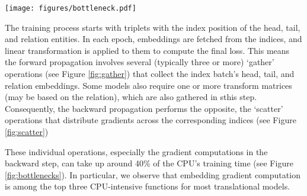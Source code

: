 \begin{figure*}[!t]
\centering
\texttt{[image: figures/bottleneck.pdf]}
\caption{Top three CPU intensive functions for various translation-based KGE models and datasets (indicated in bracket). The redness represents the popularity of a function among models. The dark red box indicates that the corresponding function is used in several different models.  indicates that the function is typically exclusive to the current model. The dark gray box indicates the dataset loading time. The light gray box indicates the rest of the training time.}
\label{fig:bottlenecks}
\end{figure*}

The training process starts with triplets with the index position of the head, tail, and relation entities. In each epoch, embeddings are fetched from the indices, and linear transformation is applied to them to compute the final loss. This means the forward propagation involves several (typically three or more) `gather' operations (see Figure \ref{fig:gather}) that collect the index batch's head, tail, and relation embeddings. Some models also require one or more transform matrices (may be based on the relation), which are also gathered in sthis step. Consequently, the backward propagation performs the opposite, the `scatter' operations that distribute gradients across the corresponding indices (see Figure \ref{fig:scatter}) 

These individual operations, especially the gradient computations in the backward step, can take up around 40\% of the CPU's training time (see Figure \ref{fig:bottlenecks}). In particular, we observe that embedding gradient computation is among the top three CPU-intensive functions for most translational models.

